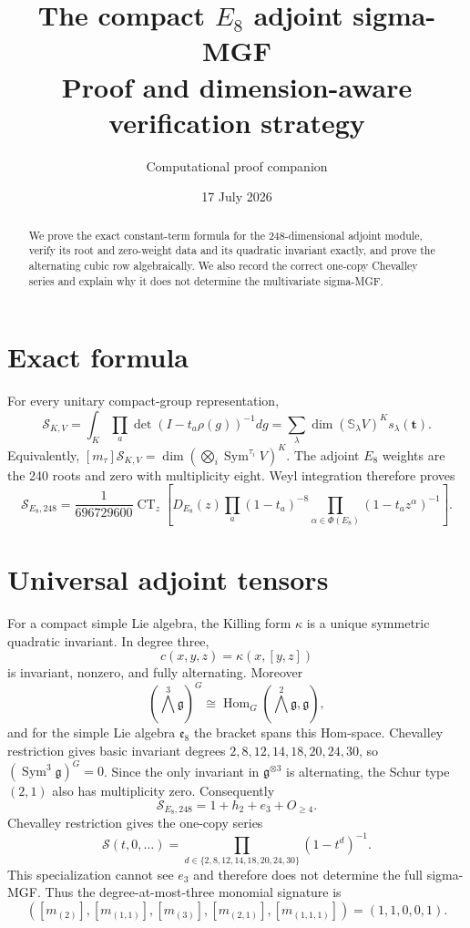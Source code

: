 \documentclass[10pt]{article}
\title{\color{navy}\textbf{The compact $E_8$ adjoint sigma-MGF}\\[1mm]\large Proof and dimension-aware verification strategy}
\author{Computational proof companion}\date{17 July 2026}
\newcommand{\Sg}{\mathcal S}\newcommand{\CT}{\operatorname{CT}}
\begin{document}
\maketitle
\begin{abstract}
We prove the exact constant-term formula for the 248-dimensional adjoint
module, verify its root and zero-weight data and its quadratic invariant
exactly, and prove the alternating cubic row algebraically.  We also
record the correct one-copy Chevalley series and explain why it does not
determine the multivariate sigma-MGF.
\end{abstract}

\section{Exact formula}
For every unitary compact-group representation,
\[
 \Sg_{K,V}=\int_K\prod_a\det(I-t_a\rho(g))^{-1}dg
 =\sum_\lambda\dim(\mathbb S_\lambda V)^K s_\lambda(\mathbf t).
\]
Equivalently,
$[m_\tau]\Sg_{K,V}=\dim(\bigotimes_i\operatorname{Sym}^{\tau_i}V)^K$.
The adjoint $E_8$ weights are the 240 roots and zero with multiplicity eight.
Weyl integration therefore proves
\[
 \boxed{\Sg_{E_8,248}=\frac1{696729600}\CT_z\left[D_{E_8}(z)
 \prod_a(1-t_a)^{-8}\prod_{\alpha\in\Phi(E_8)}
 (1-t_a z^\alpha)^{-1}\right].}
\]

\section{Universal adjoint tensors}
For a compact simple Lie algebra, the Killing form $\kappa$ is a unique
symmetric quadratic invariant.  In degree three,
\[
 c(x,y,z)=\kappa(x,[y,z])
\]
is invariant, nonzero, and fully alternating.  Moreover
\[
(\bigwedge^3\mathfrak g)^G\cong
\operatorname{Hom}_G(\bigwedge^2\mathfrak g,\mathfrak g),
\]
and for the simple Lie algebra $\mathfrak e_8$ the bracket spans this
Hom-space.  Chevalley restriction gives basic invariant degrees
$2,8,12,14,18,20,24,30$, so $(\operatorname{Sym}^3\mathfrak g)^G=0$.
Since the only invariant in $\mathfrak g^{\otimes3}$ is alternating, the
Schur type $(2,1)$ also has multiplicity zero.  Consequently
\[
 \boxed{\Sg_{E_8,248}=1+h_2+e_3+O_{\ge4}.}
\]
Chevalley restriction gives the one-copy series
\[
 \boxed{\Sg(t,0,\ldots)=\prod_{d\in\{2,8,12,14,18,20,24,30\}}
 (1-t^d)^{-1}.}
\]
This specialization cannot see $e_3$ and therefore does not determine the
full sigma-MGF.
Thus the degree-at-most-three monomial signature is
\[
([m_{(2)}],[m_{(1,1)}],[m_{(3)}],[m_{(2,1)}],[m_{(1,1,1)}])
=(1,1,0,0,1).
\]
\end{document}
